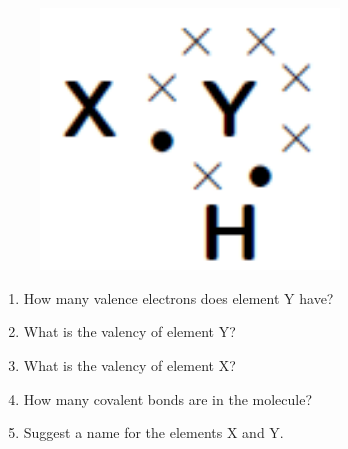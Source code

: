 \begin{enumerate}[noitemsep, label=\textbf{\arabic*}. ]
    \setcounter{subfigure}{0}


	\begin{figure}[H] %
    \begin{center}
    \label{m38701*id141174!!!underscore!!!media}\label{m38701*id141174!!!underscore!!!printimage}\includegraphics[width=300px]{col11305.imgs/m38701_CG11C1_018.png} %
        
      \vspace{2pt}
    \vspace{.1in}
    
    \end{center}

 \end{figure}   

    \addtocounter{footnote}{-0}
    \label{m38701*id141181}\begin{enumerate}[noitemsep, label=\textbf{\alph*}. ] 
            \label{m38701*uid39}\item How many valence electrons does element \begin{math}\mathrm{Y}\end{math} have?
\label{m38701*uid40}\item What is the valency of element \begin{math}\mathrm{Y}\end{math}?
\label{m38701*uid41}\item What is the valency of element \begin{math}\mathrm{X}\end{math}?
\label{m38701*uid42}\item How many covalent bonds are in the molecule?
\label{m38701*uid43}\item Suggest a name for the elements \begin{math}\mathrm{X}\end{math} and \begin{math}\mathrm{Y}\end{math}.
\end{enumerate}
                \end{enumerate}
        

